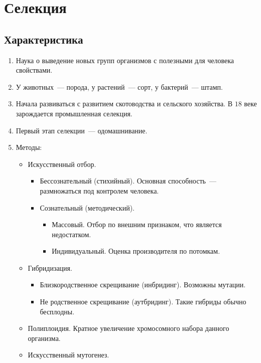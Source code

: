 \documentclass[12pt]{article}
\begin{document}
	\section{Селекция}
	
	\subsection{Характеристика}
	
	\begin{enumerate}
		\item Наука о выведение новых групп организмов с полезными для человека свойствами.
		
		\item У животных~--- порода, у растений~--- сорт, у бактерий~--- штамп.
		
		\item Начала развиваться с развитием скотоводства и сельского хозяйства. В $18$ веке зарождается промышленная селекция.
		
		\item Первый этап селекции~--- одомашнивание.
		
		\item Методы:
		
		\begin{itemize}
			\item Искусственный отбор.
			
			\begin{itemize}
				\item Бессознательный (стихийный). Основная способность~--- размножаться под контролем человека.
				
				\item Сознательный (методический).
				
				\begin{itemize}
					\item Массовый. Отбор по внешним признаком, что является недостатком.
					
					\item Индивидуальный. Оценка производителя по потомкам.
				\end{itemize}
			\end{itemize}
			
			\item Гибридизация.
			
			\begin{itemize}
				\item Близкородственное скрещивание (инбридинг). Возможны мутации.
				
				\item Не родственное скрещивание (аутбридинг). Такие гибриды обычно бесплодны.
			\end{itemize}
			
			\item Полиплоидия. Кратное увеличение хромосомного набора данного организма.
			
			\item Искусственный мутогенез.
		\end{itemize}
	\end{enumerate}
	
\end{document}

